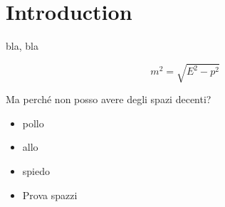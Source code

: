 
\section{Introduction}

bla, bla 

\[
m^2 = \sqrt{E^2-p^2}
\]

Ma perch\'e non posso avere degli spazi decenti?

\begin{itemize}
\item pollo
\item allo 
\item spiedo
\item Prova spazzi 
\end{itemize}